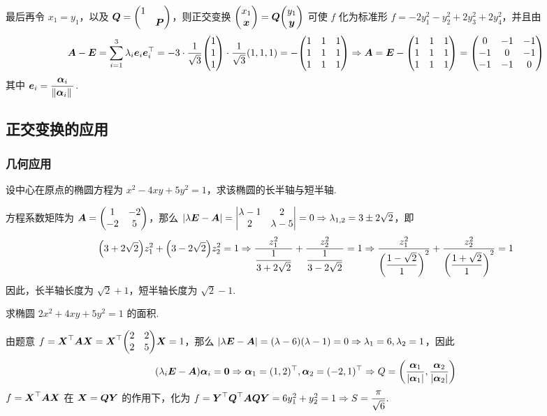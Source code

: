 \begin{solution}
    最后再令 $x_1=y_1$，以及 $\vb*{Q}=\mqty(1\\&\vb*{P})$，则正交变换 $\mqty(x_1\\\vb*{x})=\vb*{Q}\mqty(y_1\\\vb*{y})$ 可使 $f$ 化为标准形 $f=-2y_1^2-y_2^2+2y_3^2+2y_4^2$，并且由
    $$\vb*{A}-\vb*{E}=\sum_{i=1}^{3}\lambda_i\vb*{e}_i\vb*{e}_i^\top=-3\cdot\dfrac{1}{\sqrt{3}}\mqty(1\\1\\1)\cdot\dfrac{1}{\sqrt{3}}(1,1,1)=-\mqty(1&1&1\\1&1&1\\1&1&1)\Rightarrow \vb*{A}=\vb*{E}-\mqty(1&1&1\\1&1&1\\1&1&1)=\mqty(0&-1&-1\\-1&0&-1\\-1&-1&0)$$
    其中 $\vb*{e}_i=\dfrac{\vb*{\alpha}_i}{\norm*{\vb*{\alpha}_i}}$.
\end{solution}

\subsection{正交变换的应用}

\subsubsection{几何应用}

\begin{example}
    设中心在原点的椭圆方程为 $x^2-4xy+5y^2=1$，求该椭圆的长半轴与短半轴.
\end{example}
\begin{solution}
    方程系数矩阵为 $\vb*{A}=\mqty(1&-2\\-2&5)$，那么 $|\lambda\vb*{E}-\vb*{A}|=\mqty|\lambda-1 & 2\\2&\lambda-5|=0\Rightarrow \lambda_{1,2}=3\pm 2\sqrt{2}$，即
    $$\qty(3+2\sqrt{2})z_1^2+\qty(3-2\sqrt{2})z_2^2=1\Rightarrow \dfrac{z_1^2}{\dfrac{1}{3+2\sqrt{2}}}+\dfrac{z_2^2}{\dfrac{1}{3-2\sqrt{2}}}=1\Rightarrow \dfrac{z_1^2}{\qty(\dfrac{1-\sqrt{2}}{1})^2}+\dfrac{z_2^2}{\qty(\dfrac{1+\sqrt{2}}{1})^2}=1$$
    因此，长半轴长度为 $\sqrt{2}+1$，短半轴长度为 $\sqrt{2}-1.$
\end{solution}

\begin{example}
    求椭圆 $2x^2+4xy+5y^2=1$ 的面积.
\end{example}
\begin{solution}
    由题意 $f=\vb*{X}^\top\vb*{AX}=\vb*{X}^\top\mqty(2&2\\2&5)\vb*{X}=1$，那么 $|\lambda \vb*{E}-\vb*{A}|=(\lambda-6)(\lambda-1)=0\Rightarrow \lambda_1=6,\lambda_2=1$，因此 
    $$(\lambda_i\vb*{E}-\vb*{A})\vb*{\alpha}_i=\vb*{0}\Rightarrow \vb*{\alpha}_1=(1,2)^\top,\vb*{\alpha}_2=(-2,1)^\top\Rightarrow Q=\qty(\dfrac{\vb*{\alpha}_1}{|\vb*{\alpha}_1|},\dfrac{\vb*{\alpha}_2}{|\vb*{\alpha}_2|})$$
    $f=\vb*{X}^\top\vb*{AX}$ 在 $\vb*{X}=\vb*{QY}$ 的作用下，化为 $f=\vb*{Y}^\top\vb*{Q}^\top\vb*{AQY}=6y_1^2+y_2^2=1\Rightarrow S=\dfrac{\pi}{\sqrt{6}}.$
\end{solution}

